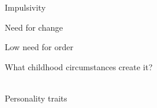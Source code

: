 \documentclass[aspectratio=169]{beamer}
\begin{document}
\begin{frame}
  \begin{center}
    \Huge Impulsivity
    \\ \small \cite{langford93}
  \end{center}
\end{frame}

\begin{frame}
  \begin{center}
    \Huge Need for change
    \\ \small \cite{langford93}
  \end{center}
\end{frame}

\begin{frame}
  \begin{center}
    \Huge Low need for order
    \\ \small \cite{langford93}
  \end{center}
\end{frame}

\begin{frame}
  \begin{center}
    \Huge What childhood circumstances create it?
    \\ \small \cite{sakulku11}
    \\ \small \cite{langford93}
  \end{center}
\end{frame}

\begin{frame}
  \begin{center}
    \Huge Personality traits
    \\ \small \cite{hh15}
    \\ \small \cite{sakulku11}
  \end{center}
\end{frame}
\end{document}
